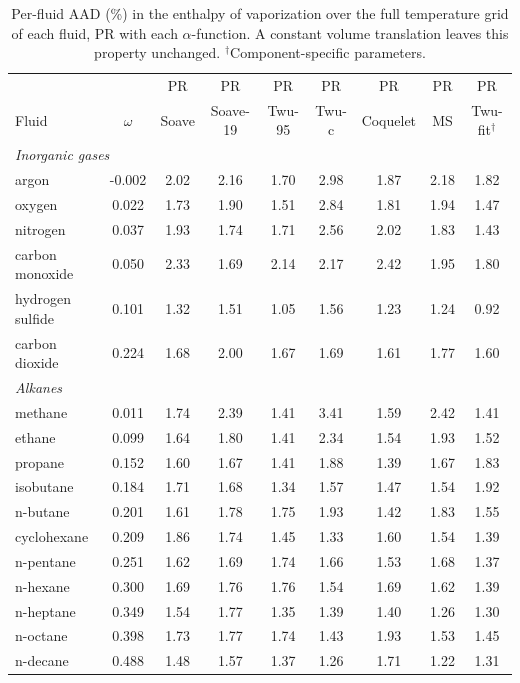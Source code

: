 \begin{table}[H]
\centering
\caption{Per-fluid AAD (\%) in the enthalpy of vaporization over the full temperature grid of each fluid, PR with each $\alpha$-function. A constant volume translation leaves this property unchanged. $^{\dagger}$Component-specific parameters.}
\label{tab:tabS_perfluid_hvap_pr}
\small
\begin{tabular}{lcccccccc}
\toprule
 &  & PR & PR & PR & PR & PR & PR & PR \\
Fluid & $\omega$ & Soave & Soave-19 & Twu-95 & Twu-c & Coquelet & MS & Twu-fit$^{\dagger}$ \\
\midrule
\multicolumn{9}{l}{\emph{Inorganic gases}} \\
argon & -0.002 & 2.02 & 2.16 & 1.70 & 2.98 & 1.87 & 2.18 & 1.82 \\
oxygen & 0.022 & 1.73 & 1.90 & 1.51 & 2.84 & 1.81 & 1.94 & 1.47 \\
nitrogen & 0.037 & 1.93 & 1.74 & 1.71 & 2.56 & 2.02 & 1.83 & 1.43 \\
carbon monoxide & 0.050 & 2.33 & 1.69 & 2.14 & 2.17 & 2.42 & 1.95 & 1.80 \\
hydrogen sulfide & 0.101 & 1.32 & 1.51 & 1.05 & 1.56 & 1.23 & 1.24 & 0.92 \\
carbon dioxide & 0.224 & 1.68 & 2.00 & 1.67 & 1.69 & 1.61 & 1.77 & 1.60 \\
\multicolumn{9}{l}{\emph{Alkanes}} \\
methane & 0.011 & 1.74 & 2.39 & 1.41 & 3.41 & 1.59 & 2.42 & 1.41 \\
ethane & 0.099 & 1.64 & 1.80 & 1.41 & 2.34 & 1.54 & 1.93 & 1.52 \\
propane & 0.152 & 1.60 & 1.67 & 1.41 & 1.88 & 1.39 & 1.67 & 1.83 \\
isobutane & 0.184 & 1.71 & 1.68 & 1.34 & 1.57 & 1.47 & 1.54 & 1.92 \\
n-butane & 0.201 & 1.61 & 1.78 & 1.75 & 1.93 & 1.42 & 1.83 & 1.55 \\
cyclohexane & 0.209 & 1.86 & 1.74 & 1.45 & 1.33 & 1.60 & 1.54 & 1.39 \\
n-pentane & 0.251 & 1.62 & 1.69 & 1.74 & 1.66 & 1.53 & 1.68 & 1.37 \\
n-hexane & 0.300 & 1.69 & 1.76 & 1.76 & 1.54 & 1.69 & 1.62 & 1.39 \\
n-heptane & 0.349 & 1.54 & 1.77 & 1.35 & 1.39 & 1.40 & 1.26 & 1.30 \\
n-octane & 0.398 & 1.73 & 1.77 & 1.74 & 1.43 & 1.93 & 1.53 & 1.45 \\
n-decane & 0.488 & 1.48 & 1.57 & 1.37 & 1.26 & 1.71 & 1.22 & 1.31 \\

\end{tabular}
\end{table}
